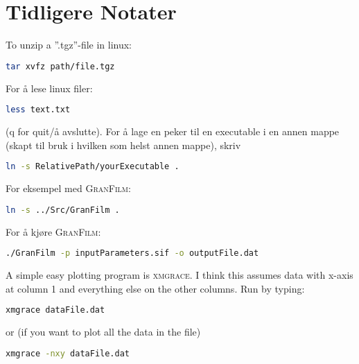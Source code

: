 \section{Tidligere Notater}
To unzip a ''.tgz''-file in linux:
\begin{lstlisting}[style=FormattedNumber, frame=none,language=bash]
   tar xvfz path/file.tgz
\end{lstlisting}
%
For å lese linux filer:
\begin{lstlisting}[style=FormattedNumber, frame=none,language=bash]
   less text.txt
\end{lstlisting}
(q for quit/å avslutte). 
%
For å lage en peker til en executable i en annen mappe (skapt til bruk i hvilken som helst annen mappe), skriv
\begin{lstlisting}[style=FormattedNumber,frame=none, language=bash]
   ln -s RelativePath/yourExecutable .
\end{lstlisting}
For eksempel med \textsc{GranFilm}:
\begin{lstlisting}[style=FormattedNumber,frame=none, language=bash]
   ln -s ../Src/GranFilm .
\end{lstlisting}
For å kjøre \textsc{GranFilm}:
\begin{lstlisting}[style=FormattedNumber,frame=none, language=bash]
   ./GranFilm -p inputParameters.sif -o outputFile.dat
\end{lstlisting}
%
A simple easy plotting program is \textsc{xmgrace}. I think this assumes
data with x-axis at column 1 and everything else on the other columns. Run by typing:
\begin{lstlisting}[style=FormattedNumber,frame=none, language=bash]
   xmgrace dataFile.dat
\end{lstlisting}
or (if you want to plot all the data in the file)
\begin{lstlisting}[style=FormattedNumber,frame=none, language=bash]
   xmgrace -nxy dataFile.dat
\end{lstlisting}

